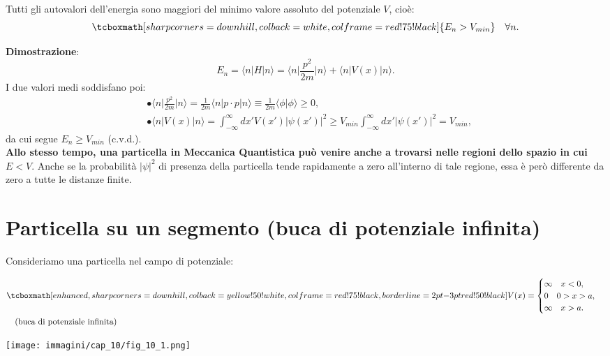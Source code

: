 Tutti gli autovalori dell'energia sono maggiori del minimo valore assoluto del potenziale $V$, cioè:
	\begin{equation}
		\tcboxmath[sharp corners=downhill, colback=white, colframe=red!75!black]{
			E_n >V_{min} 
			}\quad \forall n.
	\end{equation}
	
\textbf{Dimostrazione}:
	\begin{equation}
		E_n = \langle n \vert H \vert n \rangle =  \langle n \vert \frac{p ^2}{2m} \vert n \rangle + \langle n \vert V(x) \vert n \rangle .
	\end{equation}
I due  valori medi soddisfano poi:
	\begin{align}
		&\bullet \langle n \vert \frac{p ^2}{2m} \vert n \rangle =\frac{1}{2m} \langle n \vert p\cdot p\vert n \rangle \equiv \frac{1}{2m} \langle \phi \vert  \phi \rangle \ge 0 , \\[0.3cm]
		&\bullet \langle n \vert V(x) \vert n \rangle = \int _{-\infty} ^{\infty} dx' V(x') \vert \psi (x') \vert ^2 \geq V_{min} \int _{-\infty} ^{\infty} dx'  \vert \psi (x') \vert ^2 = V_{min} , 
	\end{align}
da cui segue $E_n \geq V_{min}$ (c.v.d.).\\

\textbf{Allo stesso tempo, una particella in Meccanica Quantistica può venire anche a trovarsi nelle regioni dello spazio in cui $E<V$}. Anche se la probabilità $|\psi|^2$ di presenza della particella tende rapidamente a zero all'interno di tale regione, essa è però differente da zero a tutte le distanze finite.
\section{Particella su un segmento (buca di potenziale infinita)}
Consideriamo una particella nel campo di potenziale:\\

\begin{minipage}{.55\textwidth}
	\begin{align}
		&\tcboxmath[enhanced, sharp corners=downhill, colback=yellow!50!white, colframe=red!75!black, borderline={2pt}{-3pt}{red!50!black}]{
			V(x)= 
			\begin{cases}
			\infty \quad x<0,\\
			0 \quad 0>x>a, \\
			\infty \quad x>a.
			\end{cases} }
			\\
			&\quad \textrm{(buca di potenziale infinita)} \nonumber
			\end{align}	
			\end{minipage}
\hspace{.5cm}
\begin{minipage}{.35\textwidth}
\texttt{[image: immagini/cap\_10/fig\_10\_1.png]}
\end{minipage}\\

